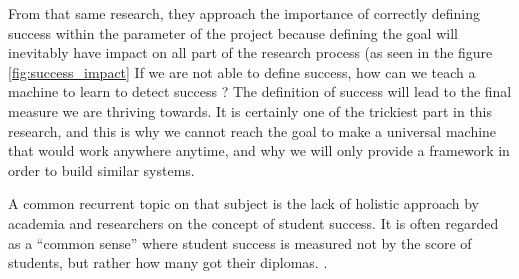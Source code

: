 \documentclass[../../main.tex]{subfiles}
\begin{document}
From that same research, they approach the importance of correctly defining success within the parameter of the project because defining the goal will inevitably have impact on all part of the research process (as seen in the figure \ref{fig:success_impact}
If we are not able to define success, how can we teach a machine to learn to detect success ? The definition of success will lead to the final measure we are thriving towards. It is certainly one of the trickiest part in this research, and this is why we cannot reach the goal to make a universal machine that would work anywhere anytime, and why we will only provide a framework in order to build similar systems. 

A common recurrent topic on that subject is the lack of holistic approach by academia and researchers on the concept of student success. It is often regarded as a “common sense” where student success is measured not by the score of students, but rather how many got their diplomas. \cite{weatherton_success_2021}.
\end{document}
